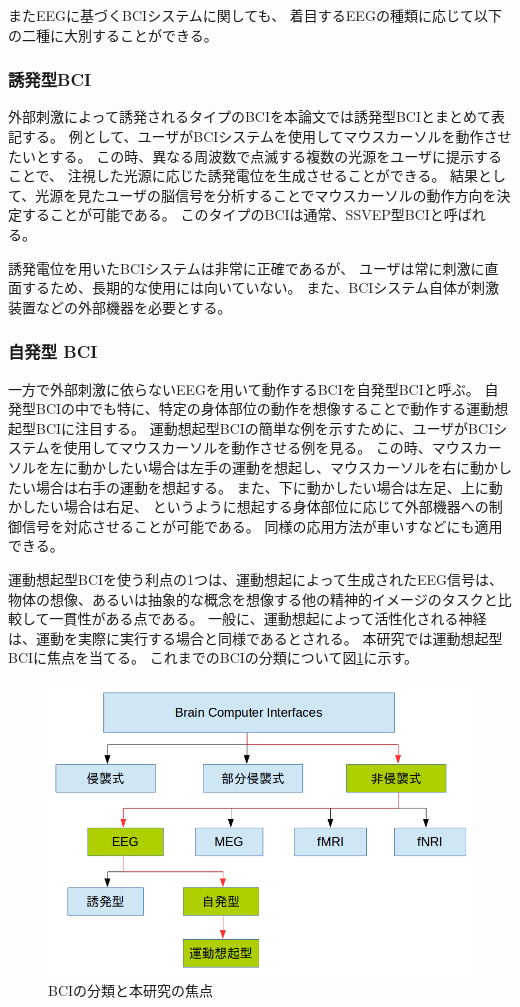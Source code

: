 またEEGに基づくBCIシステムに関しても、
着目するEEGの種類に応じて以下の二種に大別することができる。
\subsubsection{{\mc 誘発型}\rm BCI}
外部刺激によって誘発されるタイプのBCIを本論文では誘発型BCIとまとめて表記する。
例として、ユーザがBCIシステムを使用してマウスカーソルを動作させたいとする。 
この時、異なる周波数で点滅する複数の光源をユーザに提示することで、
注視した光源に応じた誘発電位を生成させることができる\cite{SSVEP}。
結果として、光源を見たユーザの脳信号を分析することでマウスカーソルの動作方向を決定することが可能である。
このタイプのBCIは通常、SSVEP型BCIと呼ばれる。

誘発電位を用いたBCIシステムは非常に正確であるが、
ユーザは常に刺激に直面するため、長期的な使用には向いていない。
また、BCIシステム自体が刺激装置などの外部機器を必要とする。
\subsubsection{\mc 自発型 \rm BCI}
一方で外部刺激に依らないEEGを用いて動作するBCIを自発型BCIと呼ぶ。
自発型BCIの中でも特に、特定の身体部位の動作を想像することで動作する運動想起型BCIに注目する。
運動想起型BCIの簡単な例を示すために、ユーザがBCIシステムを使用してマウスカーソルを動作させる例を見る。
この時、マウスカーソルを左に動かしたい場合は左手の運動を想起し、マウスカーソルを右に動かしたい場合は右手の運動を想起する。
また、下に動かしたい場合は左足、上に動かしたい場合は右足、
というように想起する身体部位に応じて外部機器への制御信号を対応させることが可能である。
同様の応用方法が車いすなどにも適用できる。

運動想起型BCIを使う利点の1つは、運動想起によって生成されたEEG信号は、
物体の想像、あるいは抽象的な概念を想像する他の精神的イメージのタスクと比較して一貫性がある点である。
一般に、運動想起によって活性化される神経は、運動を実際に実行する場合と同様であるとされる\cite{運動想起}。
本研究では運動想起型BCIに焦点を当てる。
これまでのBCIの分類について図\ref{fig:BCIclass}に示す。

\begin{figure}[tb]
    \centering
    \includegraphics[width=13cm]{images/BCIclass.png}
    \caption{BCIの分類と本研究の焦点}
    \label{fig:BCIclass}
\end{figure}


